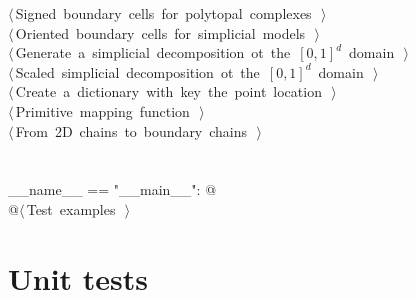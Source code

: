 \documentclass[11pt,oneside]{article}	%
\begin{document}
\begin{flushleft}
\begin{list}{}{}
\mbox{}\verb@@\hbox{$\langle\,$Signed boundary cells for polytopal complexes\nobreak\ {\footnotesize {}}$\,\rangle$}\verb@@\\
\mbox{}\verb@@\hbox{$\langle\,$Oriented boundary cells for simplicial models\nobreak\ {\footnotesize {}}$\,\rangle$}\verb@@\\
\mbox{}\verb@@\hbox{$\langle\,$Generate a simplicial decomposition ot the $[0,1]^d$ domain\nobreak\ {\footnotesize {}}$\,\rangle$}\verb@@\\
\mbox{}\verb@@\hbox{$\langle\,$Scaled simplicial decomposition ot the $[0,1]^d$ domain\nobreak\ {\footnotesize {}}$\,\rangle$}\verb@@\\
\mbox{}\verb@@\hbox{$\langle\,$Create a dictionary with key the point location\nobreak\ {\footnotesize {}}$\,\rangle$}\verb@@\\
\mbox{}\verb@@\hbox{$\langle\,$Primitive mapping function\nobreak\ {\footnotesize {}}$\,\rangle$}\verb@@\\
\mbox{}\verb@@\hbox{$\langle\,$From 2D chains to boundary chains\nobreak\ {\footnotesize {}}$\,\rangle$}\verb@@\\
\mbox{}\verb@@\\
\mbox{}\verb@@\\
\mbox{}\verb@if __name__ == "__main__": @\\
\mbox{}\verb@   @\hbox{$\langle\,$Test examples\nobreak\ {\footnotesize {}}$\,\rangle$}\verb@@\\
\mbox{}\verb@@{\NWsep}
\end{list}
\vspace{-2ex}
\end{flushleft}

\section{Unit tests}
\end{document}
